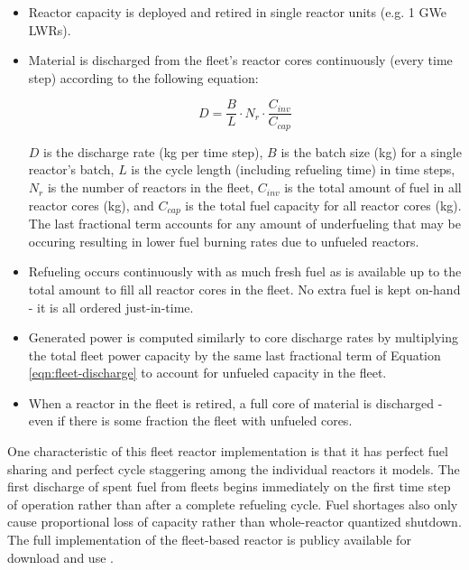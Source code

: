 \documentclass{style}
\begin{document}
\begin{itemize}

    \item Reactor capacity is deployed and retired in single reactor units
        (e.g. 1 GWe LWRs).

    \item Material is discharged from the fleet's reactor cores continuously
        (every time step) according to the following equation:

        \begin{equation}
            D =
            \frac{B}{L} \cdot N_{r} \cdot \frac{C_{inv}}{C_{cap}}
            \label{eqn:fleet-discharge}
        \end{equation}

        $D$ is the discharge rate (kg per time step), $B$ is the batch size
        (kg) for a single reactor's batch, $L$ is the cycle length (including
        refueling time) in time steps, $N_{r}$ is the number of reactors in
        the fleet, $C_{inv}$ is the total amount of fuel in all reactor cores
        (kg), and $C_{cap}$ is the total fuel capacity for all reactor cores
        (kg).  The last fractional term accounts for any amount of
        underfueling that may be occuring resulting in lower fuel burning
        rates due to unfueled reactors.

    \item Refueling occurs continuously with as much fresh fuel as is
        available up to the total amount to fill all reactor cores in the
        fleet.  No extra fuel is kept on-hand - it is all ordered
        just-in-time.

    \item Generated power is computed similarly to core discharge rates by
        multiplying the total fleet power capacity by the same last fractional
        term of Equation \ref{eqn:fleet-discharge} to account for unfueled
        capacity in the fleet.

    \item When a reactor in the fleet is retired, a full core of material is
        discharged - even if there is some fraction the fleet with unfueled
        cores.
        
\end{itemize}

One characteristic of this fleet reactor implementation is that it has perfect
fuel sharing and perfect cycle staggering among the individual reactors it
models.  The first discharge of spent fuel from fleets begins immediately on
the first time step of operation rather than after a complete refueling cycle.
Fuel shortages also only cause proportional loss of capacity rather than
whole-reactor quantized shutdown.  The full implementation of the fleet-based
reactor is publicy available for download and use \cite{Carlsen2015}.
\end{document}
